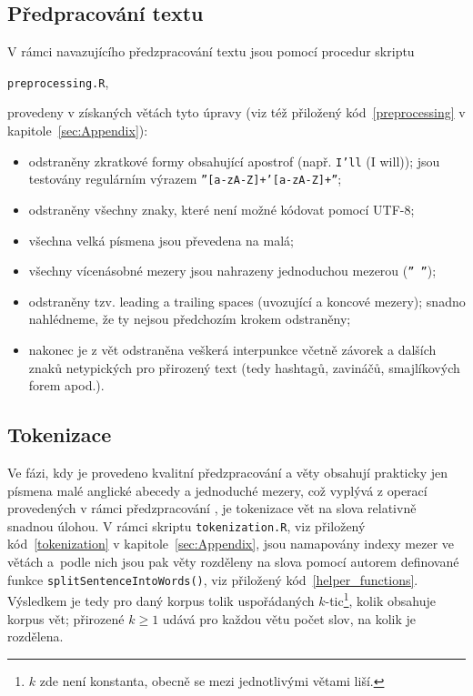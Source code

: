 \subsection{Předpracování textu}

V rámci navazujícího předzpracování
textu jsou pomocí procedur skriptu

\begin{center}
\texttt{preprocessing.R},
\end{center}

\noindent provedeny v získaných větách tyto úpravy (viz též přiložený
kód~\ref{preprocessing} v kapitole~\ref{sec:Appendix}):

\begin{itemize}
  \item odstraněny zkratkové formy obsahující apostrof (např. \texttt{I'll}
  (I will)); jsou testovány regulárním výrazem
  \texttt{''[a-zA-Z]+'[a-zA-Z]+''};
  \item odstraněny všechny znaky, které není možné kódovat pomocí UTF-8;
  \item všechna velká písmena jsou převedena na malá;
  \item všechny vícenásobné mezery jsou nahrazeny jednoduchou
  mezerou (\texttt{'' ''});
  \item odstraněny tzv. leading a trailing
  spaces (uvozující a koncové
  mezery); snadno nahlédneme, že ty nejsou předchozím krokem odstraněny;
  \item nakonec je z vět odstraněna veškerá interpunkce včetně závorek
  a dalších znaků netypických pro přirozený text (tedy hashtagů, zavináčů,
  smajlíkových forem apod.).
\end{itemize}


\subsection{Tokenizace}

Ve fázi, kdy je provedeno kvalitní předzpracování
a věty obsahují prakticky
jen písmena malé anglické abecedy a jednoduché mezery, což vyplývá z operací
provedených v rámci předzpracování%
,
je tokenizace vět na slova relativně
snadnou úlohou. V rámci skriptu \texttt{tokenization.R}, viz přiložený kód~\ref{tokenization}
v kapitole~\ref{sec:Appendix},
jsou namapovány indexy mezer ve větách a~podle nich jsou pak věty rozděleny
na slova pomocí autorem definované funkce
\texttt{splitSentenceIntoWords()}, viz přiložený kód~\ref{helper_functions}. Výsledkem je tedy
pro daný korpus tolik uspořádaných $k$-tic\footnote{$k$ zde není konstanta,
obecně se mezi jednotlivými větami liší.}, kolik obsahuje korpus vět; přirozené
$k \geq 1$ udává pro každou větu počet slov, na kolik je rozdělena.



